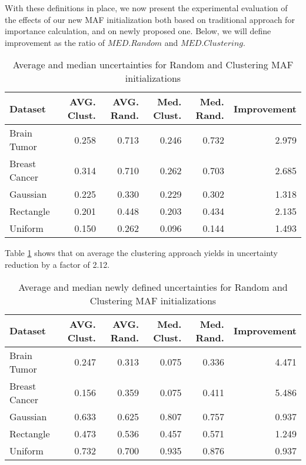 \documentclass[10pt,a4paper,oneside]{article}
\begin{document}
{\color{blue}With these definitions in place, we now present the experimental evaluation of the effects of our new MAF initialization both based on traditional approach for importance calculation, and on newly proposed one.} Below, we will define improvement as the ratio of $MED. Random$ and $MED. Clustering$.

\FloatBarrier

\begin{table}[htbp]
    \caption{Average and median uncertainties for Random and Clustering MAF initializations}
    \centering
    \label{unc-res}
    \begin{tabular}{l|r|r|r|r|r}
    \toprule
    Dataset & AVG. Clust. & AVG. Rand. & Med. Clust. & Med. Rand. & Improvement \\
    \midrule
    Brain Tumor & 0.258 & 0.713 & 0.246 & 0.732 & 2.979 \\
    Breast Cancer & 0.314 & 0.710 & 0.262 & 0.703 & 2.685 \\
    Gaussian & 0.225 & 0.330 & 0.229 & 0.302 & 1.318 \\
    Rectangle & 0.201 & 0.448 & 0.203 & 0.434 & 2.135 \\
    Uniform & 0.150 & 0.262 & 0.096 & 0.144 & 1.493 \\
    \bottomrule
    \end{tabular}
\end{table}
 Table \ref{unc-res} shows that on average the clustering approach yields in uncertainty reduction by a factor of 2.12.

\newpage
\FloatBarrier
\begin{table}[htbp]
    \caption{Average and median newly defined uncertainties for Random and Clustering MAF initializations}
    \centering
    \label{new-unce-res}
    \begin{tabular}{l|r|r|r|r|r}
    \toprule
    Dataset & AVG. Clust. & AVG. Rand. & Med. Clust. & Med. Rand. & Improvement \\
    \midrule
    Brain Tumor & 0.247 & 0.313 & 0.075 & 0.336 & 4.471 \\
    Breast Cancer & 0.156 & 0.359 & 0.075 & 0.411 & 5.486 \\
    Gaussian & 0.633 & 0.625 & 0.807 & 0.757 & 0.937 \\
    Rectangle & 0.473 & 0.536 & 0.457 & 0.571 & 1.249 \\
    Uniform & 0.732 & 0.700 & 0.935 & 0.876 & 0.937 \\
    \bottomrule
    \end{tabular}
    \label{tab:my_label}
\end{table}
\end{document}
